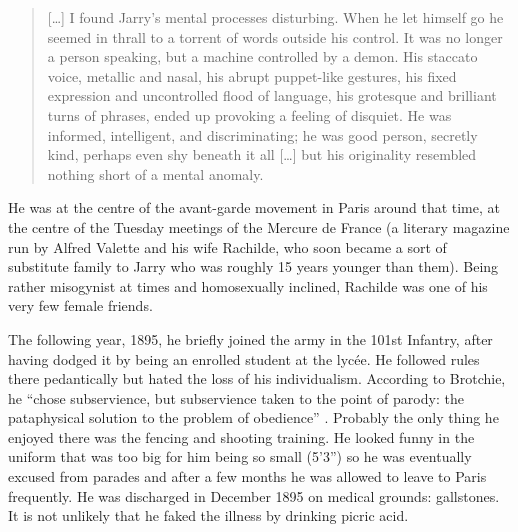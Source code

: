 \begin{quotation}
  [\ldots] I found Jarry's mental processes disturbing. When he let himself go he seemed in thrall to a torrent of words outside his control. It was no longer a person speaking, but a machine controlled by a demon. His staccato voice, metallic and nasal, his abrupt puppet-like gestures, his fixed expression and uncontrolled flood of language, his grotesque and brilliant turns of phrases, ended up provoking a feeling of disquiet. He was informed, intelligent, and discriminating; he was good person, secretly kind, perhaps even shy beneath it all [\ldots] but his originality resembled nothing short of a mental anomaly. 
\end{quotation}

He was at the centre of the avant-garde movement in Paris around that time, at the centre of the Tuesday meetings of the Mercure de France (a literary magazine run by Alfred Valette and his wife Rachilde, who soon became a sort of substitute family to Jarry who was roughly 15 years younger than them). Being rather misogynist at times and homosexually inclined, Rachilde was one of his very few female friends.

The following year, 1895, he briefly joined the army in the 101st Infantry, after having dodged it by being an enrolled student at the lycée. He followed rules there pedantically but hated the loss of his individualism. According to Brotchie, he ``chose subservience, but subservience taken to the point of parody: the pataphysical solution to the problem of obedience'' \citeyear{Brotchie2011a}. Probably the only thing he enjoyed there was the fencing and shooting training. He looked funny in the uniform that was too big for him being so small (5'3'') so he was eventually excused from parades and after a few months he was allowed to leave to Paris frequently. He was discharged in December 1895 on medical grounds: gallstones. It is not unlikely that he faked the illness by drinking picric acid.


